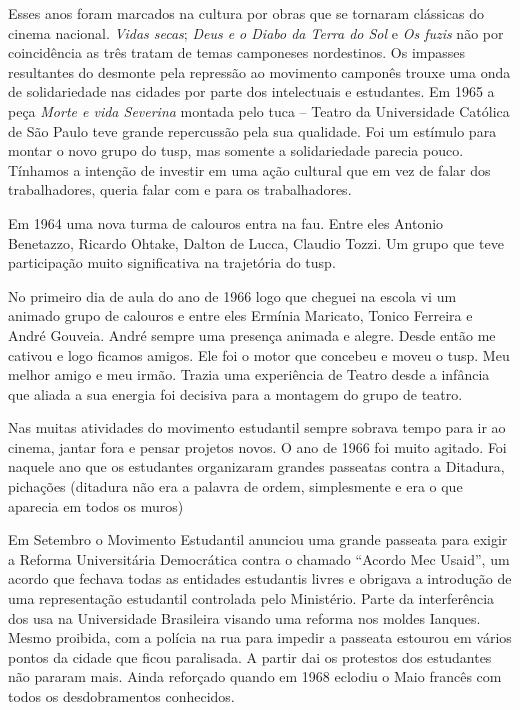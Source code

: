 Esses anos foram marcados na cultura por obras que se tornaram clássicas
do cinema nacional. {\it Vidas secas}; {\it Deus e o Diabo da Terra do
Sol} e {\it Os fuzis} não por coincidência as três tratam de temas
camponeses nordestinos. Os impasses resultantes do desmonte pela
repressão ao movimento camponês trouxe uma onda de solidariedade nas
cidades por parte dos intelectuais e estudantes. Em 1965 a peça
{\it Morte e vida Severina} montada pelo {\sc tuca} -- Teatro da Universidade
Católica de São Paulo teve grande repercussão pela sua qualidade. Foi um
estímulo para montar o novo grupo do {\sc tusp}, mas somente a solidariedade
parecia pouco. Tínhamos a intenção de investir em uma ação cultural que
em vez de falar dos trabalhadores, queria falar com e para os
trabalhadores.

Em 1964 uma nova turma de calouros entra na {\sc fau}. Entre eles Antonio
Benetazzo, Ricardo Ohtake, Dalton de Lucca, Claudio Tozzi. Um grupo que
teve participação muito significativa na trajetória do {\sc tusp}.

No primeiro dia de aula do ano de 1966 logo que cheguei na escola vi um
animado grupo de calouros e entre eles Ermínia Maricato, Tonico Ferreira
e André Gouveia. André sempre uma presença animada e alegre. Desde então
me cativou e logo ficamos amigos. Ele foi o motor que concebeu e moveu o
{\sc tusp}. Meu melhor amigo e meu irmão. Trazia uma experiência de Teatro
desde a infância que aliada a sua energia foi decisiva para a montagem
do grupo de teatro.

Nas muitas atividades do movimento estudantil sempre sobrava tempo para
ir ao cinema, jantar fora e pensar projetos novos. O ano de 1966 foi
muito agitado. Foi naquele ano que os estudantes organizaram grandes
passeatas contra a Ditadura, pichações ({\sc ditadura não} era a palavra de
ordem, simplesmente e era o que aparecia em todos os muros)

Em Setembro o Movimento Estudantil anunciou uma grande passeata para
exigir a Reforma Universitária Democrática contra o chamado “Acordo Mec
Usaid”, um acordo que fechava todas as entidades estudantis livres e
obrigava a introdução de uma representação estudantil controlada pelo
Ministério. Parte da interferência dos {\sc usa} na Universidade Brasileira
visando uma reforma nos moldes Ianques. Mesmo proibida, com a polícia na
rua para impedir a passeata estourou em vários pontos da cidade que
ficou paralisada. A partir dai os protestos dos estudantes não pararam
mais. Ainda reforçado quando em 1968 eclodiu o Maio francês com todos os
desdobramentos conhecidos.

